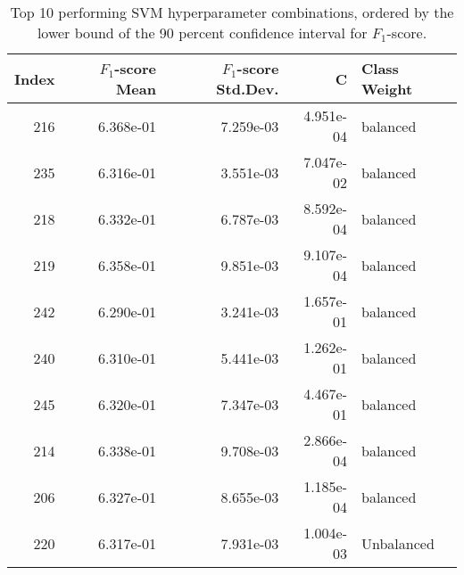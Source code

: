 \begin{table}
\caption{Top 10 performing SVM hyperparameter combinations, ordered by the lower bound of the 90 percent confidence interval for $F_1$-score.}
\label{tab:05_best_SVM_hpars}
\begin{tabular}{rrrrl}
\toprule
Index & $F_1$-score Mean & $F_1$-score Std.Dev. & C & Class Weight \\
\midrule
216 & 6.368e-01 & 7.259e-03 & 4.951e-04 & balanced \\
235 & 6.316e-01 & 3.551e-03 & 7.047e-02 & balanced \\
218 & 6.332e-01 & 6.787e-03 & 8.592e-04 & balanced \\
219 & 6.358e-01 & 9.851e-03 & 9.107e-04 & balanced \\
242 & 6.290e-01 & 3.241e-03 & 1.657e-01 & balanced \\
240 & 6.310e-01 & 5.441e-03 & 1.262e-01 & balanced \\
245 & 6.320e-01 & 7.347e-03 & 4.467e-01 & balanced \\
214 & 6.338e-01 & 9.708e-03 & 2.866e-04 & balanced \\
206 & 6.327e-01 & 8.655e-03 & 1.185e-04 & balanced \\
220 & 6.317e-01 & 7.931e-03 & 1.004e-03 & Unbalanced \\
\bottomrule
\end{tabular}
\end{table}
